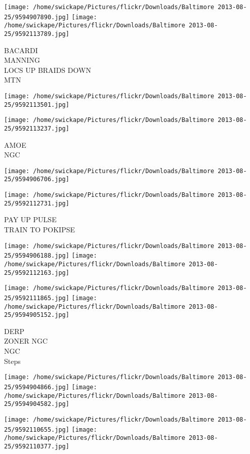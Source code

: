 \documentclass[10pt,letterpaper]{article}
\begin{document}
\texttt{[image: /home/swickape/Pictures/flickr/Downloads/Baltimore 2013-08-25/9594907890.jpg]}
\texttt{[image: /home/swickape/Pictures/flickr/Downloads/Baltimore 2013-08-25/9592113789.jpg]}

BACARDI\\
MANNING\\
LOCS UP BRAIDS DOWN\\
MTN\\
\pagebreak

\texttt{[image: /home/swickape/Pictures/flickr/Downloads/Baltimore 2013-08-25/9592113501.jpg]}

\vspace{0.25in}
\texttt{[image: /home/swickape/Pictures/flickr/Downloads/Baltimore 2013-08-25/9592113237.jpg]}

AMOE\\
NGC\\
\pagebreak

\texttt{[image: /home/swickape/Pictures/flickr/Downloads/Baltimore 2013-08-25/9594906706.jpg]}

\vspace{0.25in}
\texttt{[image: /home/swickape/Pictures/flickr/Downloads/Baltimore 2013-08-25/9592112731.jpg]}

PAY UP PULSE\\
TRAIN TO POKIPSE\\
\pagebreak

\texttt{[image: /home/swickape/Pictures/flickr/Downloads/Baltimore 2013-08-25/9594906188.jpg]}
\texttt{[image: /home/swickape/Pictures/flickr/Downloads/Baltimore 2013-08-25/9592112163.jpg]}

\texttt{[image: /home/swickape/Pictures/flickr/Downloads/Baltimore 2013-08-25/9592111865.jpg]}
\texttt{[image: /home/swickape/Pictures/flickr/Downloads/Baltimore 2013-08-25/9594905152.jpg]}

DERP\\
ZONER NGC\\
NGC\\
Steps\\
\pagebreak

\texttt{[image: /home/swickape/Pictures/flickr/Downloads/Baltimore 2013-08-25/9594904866.jpg]}
\texttt{[image: /home/swickape/Pictures/flickr/Downloads/Baltimore 2013-08-25/9594904582.jpg]}

\texttt{[image: /home/swickape/Pictures/flickr/Downloads/Baltimore 2013-08-25/9592110655.jpg]}
\texttt{[image: /home/swickape/Pictures/flickr/Downloads/Baltimore 2013-08-25/9592110377.jpg]}
\end{document}
